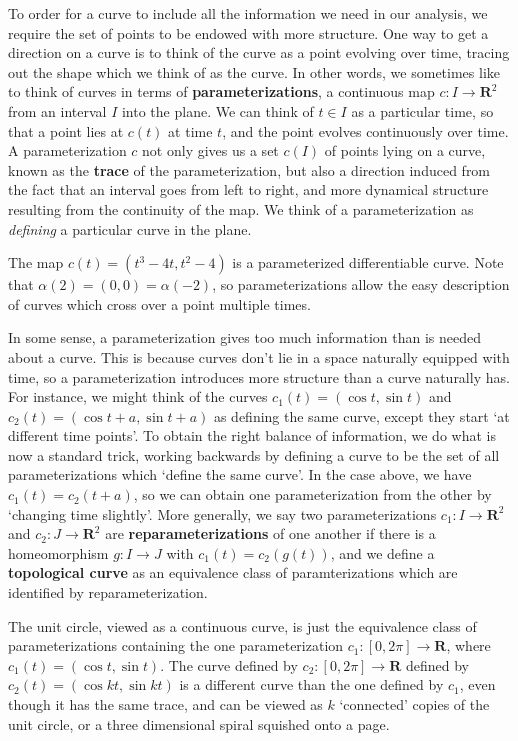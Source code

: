 To order for a curve to include all the information we need in our analysis, we require the set of points to be endowed with more structure. One way to get a direction on a curve is to think of the curve as a point evolving over time, tracing out the shape which we think of as the curve. In other words, we sometimes like to think of curves in terms of {\bf parameterizations}, a continuous map $c: I \to \mathbf{R}^2$ from an interval $I$ into the plane. We can think of $t \in I$ as a particular time, so that a point lies at $c(t)$ at time $t$, and the point evolves continuously over time. A parameterization $c$ not only gives us a set $c(I)$ of points lying on a curve, known as the {\bf trace} of the parameterization, but also a direction induced from the fact that an interval goes from left to right, and more dynamical structure resulting from the continuity of the map. We think of a parameterization as {\it defining} a particular curve in the plane.

\begin{example}
    The map $c(t) = (t^3 - 4t, t^2 - 4)$ is a parameterized differentiable curve. Note that $\alpha(2) = (0,0) = \alpha(-2)$, so parameterizations allow the easy description of curves which cross over a point multiple times.
\end{example}

In some sense, a parameterization gives too much information than is needed about a curve. This is because curves don't lie in a space naturally equipped with time, so a parameterization introduces more structure than a curve naturally has. For instance, we might think of the curves $c_1(t) = (\cos t, \sin t)$ and $c_2(t) = (\cos t + a, \sin t + a)$ as defining the same curve, except they start `at different time points'. To obtain the right balance of information, we do what is now a standard trick, working backwards by defining a curve to be the set of all parameterizations which `define the same curve'. In the case above, we have $c_1(t) = c_2(t + a)$, so we can obtain one parameterization from the other by `changing time slightly'. More generally, we say two parameterizations $c_1: I \to \mathbf{R}^2$ and $c_2: J \to \mathbf{R}^2$ are {\bf reparameterizations} of one another if there is a homeomorphism $g: I \to J$ with $c_1(t) = c_2(g(t))$, and we define a {\bf topological curve} as an equivalence class of paramterizations which are identified by reparameterization.

\begin{example}
    The unit circle, viewed as a continuous curve, is just the equivalence class of parameterizations containing the one parameterization $c_1: [0,2\pi] \to \mathbf{R}$, where $c_1(t) = (\cos t, \sin t)$. The curve defined by $c_2: [0,2\pi] \to \mathbf{R}$ defined by $c_2(t) = (\cos k t, \sin k t)$ is a different curve than the one defined by $c_1$, even though it has the same trace, and can be viewed as $k$ `connected' copies of the unit circle, or a three dimensional spiral squished onto a page.
\end{example}

